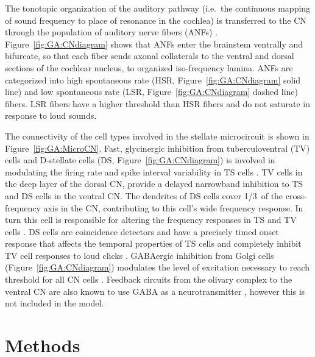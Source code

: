 \smallskip{} 

The tonotopic organization of the auditory pathway (i.e.\ the
continuous mapping of sound frequency to place of resonance in the
cochlea) is transferred to the CN through the population of auditory
nerve fibers (ANFs)
\citep{Lorente:1981}. Figure~\ref{fig:GA:CNdiagram} shows that ANFs
enter the brainstem ventrally and bifurcate, so that each fiber sends
axonal collaterals to the ventral and dorsal sections of the cochlear
nucleus, to organized iso-frequency lamina. ANFs are categorized into
high spontaneous rate (HSR, Figure~\ref{fig:GA:CNdiagram} solid line)
and low spontaneous rate (LSR, Figure~\ref{fig:GA:CNdiagram} dashed
line) fibers. LSR fibers have a higher threshold than HSR fibers and
do not saturate in response to loud sounds.

\smallskip{} 

The connectivity of the cell types involved in the stellate
microcircuit is shown in Figure~\ref{fig:GA:MicroCN}. Fast,
glycinergic inhibition from tuberculoventral (TV) cells and D-stellate
cells (DS, Figure~\ref{fig:GA:CNdiagram}) is involved in modulating
the firing rate and spike interval variability in TS cells
\citep{FerragamoGoldingEtAl:1998,WickesbergOertel:1993}. TV cells in
the deep layer of the dorsal CN, provide a delayed narrowband
inhibition to TS and DS cells in the ventral CN\@.  The dendrites of
DS cells cover 1/3~of the cross-frequency axis in the CN, contributing
to this cell's wide frequency response. In turn this cell is
responsible for altering the frequency responses in TS and TV cells
\citep{SpirouDavisEtAl:1999}. DS cells are coincidence detectors and
have a precisely timed onset response that affects the temporal
properties of TS cells
\citep{PaoliniClareyEtAl:2005,RhodeGreenberg:1994a} and completely
inhibit TV cell responses to loud clicks
\citep{SpirouDavisEtAl:1999}. GABAergic inhibition from Golgi cells
(Figure~\ref{fig:GA:CNdiagram}) modulates the level of excitation
necessary to reach threshold for all CN cells
\citep{CasparyBackoffEtAl:1994,FerragamoGoldingEtAl:1998}. Feedback
circuits from the olivary complex to the ventral CN are also known to
use GABA as a neurotransmitter \citep{SaintMorestEtAl:1989}, however
this is not included in the model.

\smallskip{} 

\section{Methods}

